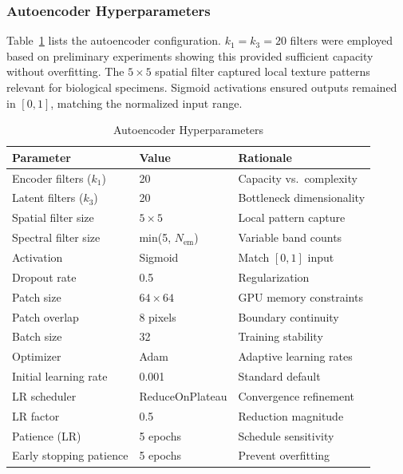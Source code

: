 \subsubsection{Autoencoder Hyperparameters}
Table~\ref{tab:hyperparams} lists the autoencoder configuration.
$k_1 = k_3 = 20$ filters were employed based on preliminary experiments showing this provided sufficient capacity without overfitting.
The $5 \times 5$ spatial filter captured local texture patterns relevant for biological specimens.
Sigmoid activations ensured outputs remained in $[0, 1]$, matching the normalized input range.

\begin{table}[!t]
\centering
\caption{Autoencoder Hyperparameters}
\label{tab:hyperparams}
\begin{tabular}{@{}lll@{}}
\toprule
\textbf{Parameter} & \textbf{Value} & \textbf{Rationale} \\
\midrule
Encoder filters ($k_1$) & 20 & Capacity vs.~complexity \\
Latent filters ($k_3$) & 20 & Bottleneck dimensionality \\
Spatial filter size & $5 \times 5$ & Local pattern capture \\
Spectral filter size & min(5, $N_{\text{em}}$) & Variable band counts \\
Activation & Sigmoid & Match $[0,1]$ input \\
Dropout rate & 0.5 & Regularization \\
Patch size & $64 \times 64$ & GPU memory constraints \\
Patch overlap & 8 pixels & Boundary continuity \\
Batch size & 32 & Training stability \\
Optimizer & Adam~\cite{kingma2014adam} & Adaptive learning rates \\
Initial learning rate & 0.001 & Standard default \\
LR scheduler & ReduceOnPlateau & Convergence refinement \\
LR factor & 0.5 & Reduction magnitude \\
Patience (LR) & 5 epochs & Schedule sensitivity \\
Early stopping patience & 5 epochs & Prevent overfitting \\
\bottomrule
\end{tabular}
\end{table}

